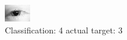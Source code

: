 \begin{figure}[h!]
\begin{center}
\includegraphics[width=0.60\columnwidth]{figures/ID89_class_4_target_3.png}
\end{center}
\caption{ Classification: 4 actual target: 3}
\label{fig:ID89_class_4_target_3}
\end{figure}
